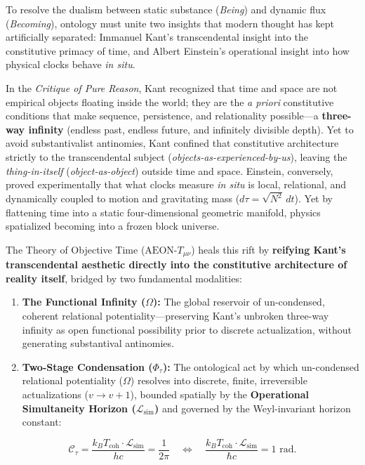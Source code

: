 \documentclass[
]{article}
\providecommand{\tightlist}{%
  \setlength{\itemsep}{0pt}\setlength{\parskip}{0pt}}
\begin{document}
To resolve the dualism between static substance (\emph{Being}) and
dynamic flux (\emph{Becoming}), ontology must unite two insights that
modern thought has kept artificially separated: Immanuel Kant's
transcendental insight into the constitutive primacy of time, and Albert
Einstein's operational insight into how physical clocks behave \emph{in
situ}.

In the \emph{Critique of Pure Reason}, Kant recognized that time and
space are not empirical objects floating inside the world; they are the
\emph{a priori} constitutive conditions that make sequence, persistence,
and relationality possible---a \textbf{three-way infinity} (endless
past, endless future, and infinitely divisible depth). Yet to avoid
substantivalist antinomies, Kant confined that constitutive architecture
strictly to the transcendental subject
(\emph{objects-as-experienced-by-us}), leaving the
\emph{thing-in-itself} (\emph{object-as-object}) outside time and space.
Einstein, conversely, proved experimentally that what clocks measure
\emph{in situ} is local, relational, and dynamically coupled to motion
and gravitating mass (\(d\tau = \sqrt{N^2}\,dt\)). Yet by flattening
time into a static four-dimensional geometric manifold, physics
spatialized becoming into a frozen block universe.

The Theory of Objective Time (\(\text{AEON-}T_{\mu\nu}\)) heals this
rift by \textbf{reifying Kant's transcendental aesthetic directly into
the constitutive architecture of reality itself}, bridged by two
fundamental modalities:

\begin{enumerate}
\def\labelenumi{\arabic{enumi}.}
\tightlist
\item
  \textbf{The Functional Infinity (\(\Omega\)):} The global reservoir of
  un-condensed, coherent relational potentiality---preserving Kant's
  unbroken three-way infinity as open functional possibility prior to
  discrete actualization, without generating substantival antinomies.
\item
  \textbf{Two-Stage Condensation (\(\Phi_\tau\)):} The ontological act
  by which un-condensed relational potentiality (\(\Omega\)) resolves
  into discrete, finite, irreversible actualizations (\(v \to v + 1\)),
  bounded spatially by the \textbf{Operational Simultaneity Horizon
  (\(\mathcal{L}_{\text{sim}}\))} and governed by the Weyl-invariant
  horizon constant:
\end{enumerate}

\[\mathcal{C}_\tau = \frac{k_B T_{\text{coh}} \cdot \mathcal{L}_{\text{sim}}}{h c} = \frac{1}{2\pi} \quad \Longleftrightarrow \quad \frac{k_B T_{\text{coh}} \cdot \mathcal{L}_{\text{sim}}}{\hbar c} = 1\text{ rad}.\]
\end{document}
